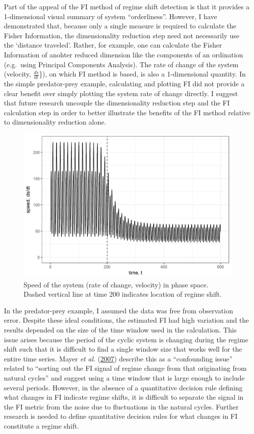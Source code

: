 \documentclass[print]{nuthesis}
\begin{document}
Part of the appeal of the FI method of regime shift detection is that it provides a 1-dimensional visual summary of system ``orderliness''. However, I have demonstrated that, because only a single measure is required to calculate the Fisher Information, the dimensionality reduction step need not necessarily use the `distance traveled'. Rather, for example, one can calculate the Fisher Information of anohter reduced dimension like the components of an ordination (e.g.~using Principal Components Analysis). The rate of change of the system (velocity, \(\frac{ds}{dt}\)\}), on which FI method is based, is also a 1-dimensional quantity. In the simple predator-prey example, calculating and plotting FI did not provide a clear benefit over simply plotting the system rate of change directly. I suggest that future research uncouple the dimensionality reduction step and the FI calculation step in order to better illustrate the benefits of the FI method relative to dimensionality reduction alone.
\begin{figure}
\includegraphics[width=0.95\linewidth]{./chapterFiles/fiGuide/figures/dsdtOverTime} \caption{Speed of the system (rate of change, velocity) in phase space. Dashed vertical line at time 200 indicates location of regime shift.}\label{fig:dsdtOverTime}
\end{figure}
In the predator-prey example, I assumed the data was free from observation error. Despite these ideal conditions, the estimated FI had high variation and the results depended on the size of the time window used in the calculation. This issue arises because the period of the cyclic system is changing during the regime shift such that it is difficult to find a single window size that works well for the entire time series. Mayer \emph{et al.} (\protect\hyperlink{ref-mayer_applications_2007}{2007}) describe this as a ``confounding issue'' related to ``sorting out the FI signal of regime change from that originating from natural cycles'' and suggest using a time window that is large enough to include several periods. However, in the absence of a quantitative decision rule defining what changes in FI indicate regime shifts, it is difficult to separate the signal in the FI metric from the noise due to fluctuations in the natural cycles. Further research is needed to define quantitative decision rules for what changes in FI constitute a regime shift.
\end{document}
